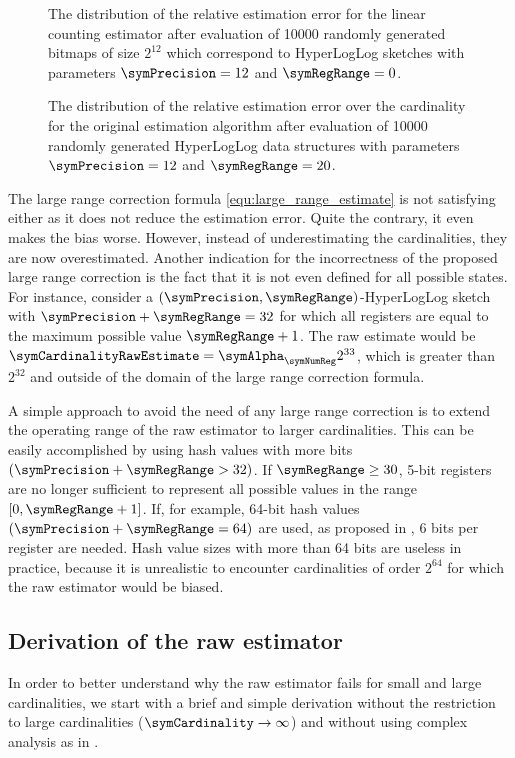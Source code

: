 \documentclass[a4paper]{scrartcl}
\begin{document}
\begin{figure}
\centering

\caption{The distribution of the relative estimation error for the linear counting estimator after evaluation of \num{10000} randomly generated bitmaps of size $2^{12}$ which correspond to HyperLogLog sketches with parameters $\symPrecision = 12$ and $\symRegRange=0$.}
\label{fig:small_range_estimate}
\end{figure}

\begin{figure}
\centering

\caption{The distribution of the relative estimation error over the cardinality for the original estimation algorithm after evaluation of \num{10000} randomly generated HyperLogLog data structures with parameters $\symPrecision = 12$ and $\symRegRange=20$.}
\label{fig:original_estimate}
\end{figure}

The large range correction formula \eqref{equ:large_range_estimate} is not satisfying either as it does not reduce the estimation error. Quite the contrary, it even makes the bias worse. However, instead of underestimating the cardinalities, they are now overestimated. Another indication for the incorrectness of the proposed large range correction is the fact that it is not even defined for all possible states. For instance, consider a $(\symPrecision,\symRegRange)$-HyperLogLog sketch with $\symPrecision+\symRegRange=32$ for which all registers are equal to the maximum possible value $\symRegRange+1$. The raw estimate would be $\symCardinalityRawEstimate = \symAlpha_\symNumReg 2^{33}$, which is greater than $2^{32}$ and outside of the domain of the large range correction formula.

A simple approach to avoid the need of any large range correction is to extend the operating range of the raw estimator to larger cardinalities. This can be easily accomplished by using hash values with more bits $(\symPrecision+\symRegRange>32)$. If $\symRegRange \geq 30$, 5-bit registers are no longer sufficient to represent all possible values in the range $[0, \symRegRange+1]$. If, for example, 64-bit hash values $(\symPrecision+\symRegRange=64)$ are used, as proposed in \cite{Heule2013}, 6 bits per register are needed. Hash value sizes with more than 64 bits are useless in practice, because it is unrealistic to encounter cardinalities of order $2^{64}$ for which the raw estimator would be biased.

\subsection{Derivation of the raw estimator}
\label{sec:derivation_raw_estimator}
In order to better understand why the raw estimator fails for small and large cardinalities, we start with a brief and simple derivation without the restriction to large cardinalities ($\symCardinality\rightarrow\infty$) and without using complex analysis as in \cite{Flajolet2007}.
\end{document}
